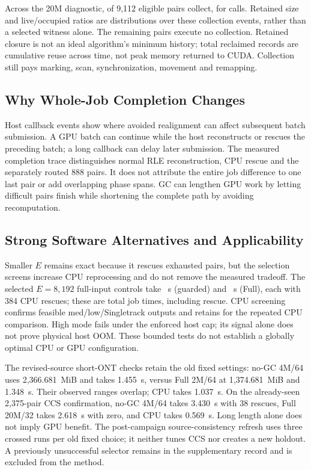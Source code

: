 \documentclass[conference,a4paper]{IEEEtran}
\begin{document}
Across the 20M diagnostic, \CollectedPairsTwenty{} of 9,112 eligible pairs collect, for \CollectionsTwenty{} calls. Retained size and live/occupied ratios are distributions over these collection events, rather than a selected witness alone. The remaining pairs execute no collection. Retained closure is not an ideal algorithm's minimum history; total reclaimed records are cumulative reuse across time, not peak memory returned to CUDA. Collection still pays marking, scan, synchronization, movement and remapping.


\subsection{Why Whole-Job Completion Changes}
Host callback events show where avoided realignment can affect subsequent batch submission. A GPU batch can continue while the host reconstructs or rescues the preceding batch; a long callback can delay later submission. The measured completion trace distinguishes normal RLE reconstruction, CPU rescue and the separately routed 888 pairs. It does not attribute the entire job difference to one last pair or add overlapping phase spans. GC can lengthen GPU work by letting difficult pairs finish while shortening the complete path by avoiding recomputation.

\subsection{Strong Software Alternatives and Applicability}
Smaller $E$ remains exact because it rescues exhausted pairs, but the selection screens increase CPU reprocessing and do not remove the measured tradeoff. The selected $E=8,192$ full-input controls take \SmallEGuard{}~s (guarded) and \SmallEFull{}~s (Full), each with 384 CPU rescues; these are total job times, including rescue. CPU screening confirms feasible med/low/Singletrack outputs and retains \CpuChoice{} for the repeated CPU comparison. High mode fails under the enforced host cap; its signal alone does not prove physical host OOM. These bounded tests do not establish a globally optimal CPU or GPU configuration.

The revised-source short-ONT checks retain the old fixed settings: no-GC 4M/64 uses 2,366.681~MiB and takes 1.455~s, versus Full 2M/64 at 1,374.681~MiB and 1.348~s. Their observed ranges overlap; CPU takes 1.037~s. On the already-seen 2,375-pair CCS confirmation, no-GC 4M/64 takes 3.430~s with 38 rescues, Full 20M/32 takes 2.618~s with zero, and CPU takes 0.569~s. Long length alone does not imply GPU benefit. The post-campaign source-consistency refresh uses three crossed runs per old fixed choice; it neither tunes CCS nor creates a new holdout. A previously unsuccessful selector remains in the supplementary record and is excluded from the method.
\end{document}
